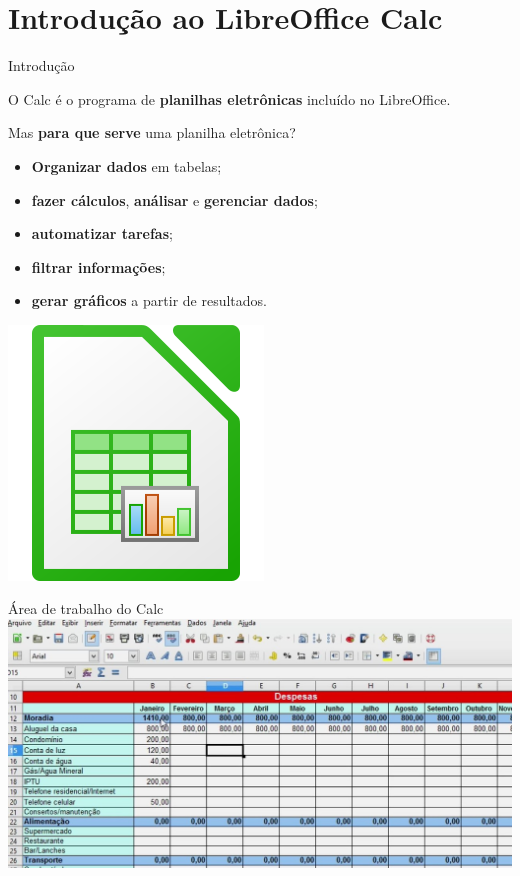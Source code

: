 \section{Introdução ao LibreOffice Calc}

\begin{frame}{Introdução}
	\begin{block}{}
		O Calc é o programa de \textbf{planilhas eletrônicas} incluído no LibreOffice.
		
		\medskip
		
		Mas \textbf{para que serve} uma planilha eletrônica?
		\begin{itemize}
			\item \textbf{Organizar dados} em tabelas;
			\item \textbf{fazer cálculos}, \textbf{análisar} e \textbf{gerenciar dados};
			\item \textbf{automatizar tarefas};
			\item \textbf{filtrar informações};
			\item \textbf{gerar gráficos} a partir de resultados.
		\end{itemize}
	\end{block}
	
	\centering
	\includegraphics[width=0.25\linewidth]{Figuras/Ch06/fig1}
\end{frame}


\begin{frame}{Área de trabalho do Calc}
	\centering
	\includegraphics[width=1\linewidth]{Figuras/Ch06/fig0}
\end{frame}


